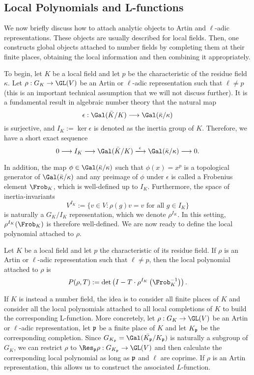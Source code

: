 \subsection{Local Polynomials and L-functions}
We now briefly discuss how to attach analytic objects to Artin and $\ell$-adic representations. These objects are usually described for local fields. Then, one constructs global objects attached to number fields by completing them at their finite places, obtaining the local information and then combining it appropriately. 

To begin, let $K$ be a local field and let $p$ be the characteristic of the residue field $\kappa$. Let $\rho:G_K\to\GL(V)$ be an Artin or $\ell$-adic representation such that $\ell\neq p$ (this is an important technical assumption that we will not discuss further). It is a fundamental result in algebraic number theory that the natural map 
$$\epsilon:\Gal(\bar{K}/K)\longrightarrow\Gal(\bar{\kappa}/\kappa)$$
is surjective, and $I_K:=\ker\epsilon$ is denoted as the inertia group of $K$. Therefore, we have a short exact sequence
$$0\longrightarrow I_K\longrightarrow \Gal(\bar{K}/K)\xlongrightarrow{\epsilon} \Gal(\bar{\kappa}/\kappa)\longrightarrow 0.$$

In addition, the map $\phi\in\Gal(\bar\kappa/\kappa)$ such that $\phi(x)=x^p$ is a topological generator of $\Gal(\bar\kappa/\kappa)$ and any preimage of $\phi$ under $\epsilon$ is called a Frobenius element $\Frob_K$, which is well-defined up to $I_K$. Furthermore, the space of inertia-invariants 
$$V^{I_K}:=\{v\in V:\rho(g)v=v\text{ for all }g\in I_K\}$$
is naturally a $G_K/I_K$ representation, which we denote $\rho^{I_K}$. In this setting, $\rho^{I_K}(\Frob_K)$ is therefore well-defined. We are now ready to define the local polynomial attached to $\rho$.

\begin{defn}
    Let $K$ be a local field and let $p$ the characteristic of its residue field. If $\rho$ is an Artin or $\ell$-adic representation such that $\ell\neq p$, then the local polynomial attached to $\rho$ is
    $$P(\rho,T):=\det\left(I-T\cdot\rho^{I_K}\left(\Frob_K^{-1}\right)\right).$$  
\end{defn}

If $K$ is instead a number field, the idea is to consider all finite places of $K$ and consider all the local polynomials attached to all local completions of $K$ to build the corresponding L-function. More concretely, let $\rho:G_K\to\GL(V)$ be an Artin or $\ell$-adic representation, let $\mathfrak{p}$ be a finite place of $K$ and let $K_{\mathfrak{p}}$ be the corresponding completion. Since $G_{K_\pp}=\Gal(\bar{K_\pp}/K_\pp)$ is naturally a subgroup of $G_K$, we can restrict $\rho$ to $\Res_\pp\rho:G_{K_\pp}\to\GL(V)$ and then calculate the corresponding local polynomial as long as $\mathfrak{p}$ and $\ell$ are coprime. If $\rho$ is an Artin representation, this allows us to construct the associated $L$-function.

